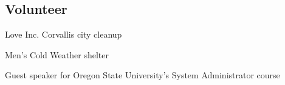 \documentclass[margin,line]{resume}
\begin{document}
\begin{resume}
    \section{\mysidestyle Volunteer}
    \begin{list2}
    \item Love Inc. Corvallis city cleanup
    \item Men's Cold Weather shelter
    \item Guest speaker for Oregon State University's System Administrator course
    \end{list2}\vspace{-1.5mm}







\end{resume}
\end{document}
